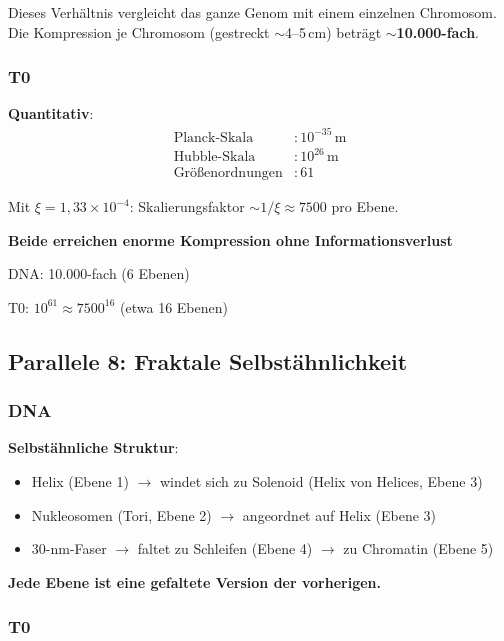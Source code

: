 	Dieses Verhältnis vergleicht das ganze Genom mit einem einzelnen Chromosom. Die Kompression je Chromosom (gestreckt $\sim$4--5\,cm) beträgt $\sim$\textbf{10.000-fach}.

	\subsubsection{T0}

	\textbf{Quantitativ}:
	\begin{align}
		\text{Planck-Skala} &: 10^{-35}\,\text{m} \\
		\text{Hubble-Skala} &: 10^{26}\,\text{m} \\
		\text{Größenordnungen} &: 61
	\end{align}

	Mit $\xi = 1{,}33 \times 10^{-4}$: Skalierungsfaktor $\sim 1/\xi \approx 7500$ pro Ebene.

	\begin{keyresult}
		\textbf{Beide erreichen enorme Kompression ohne Informationsverlust}

		DNA: 10.000-fach (6 Ebenen)

		T0: $10^{61} \approx 7500^{16}$ (etwa 16 Ebenen)
	\end{keyresult}

	\subsection{Parallele 8: Fraktale Selbstähnlichkeit}

	\subsubsection{DNA}

	\textbf{Selbstähnliche Struktur}:
	\begin{itemize}
		\item Helix (Ebene 1) $\to$ windet sich zu Solenoid (Helix von Helices, Ebene 3)
		\item Nukleosomen (Tori, Ebene 2) $\to$ angeordnet auf Helix (Ebene 3)
		\item 30-nm-Faser $\to$ faltet zu Schleifen (Ebene 4) $\to$ zu Chromatin (Ebene 5)
	\end{itemize}

	\textbf{Jede Ebene ist eine gefaltete Version der vorherigen.}

	\subsubsection{T0}


